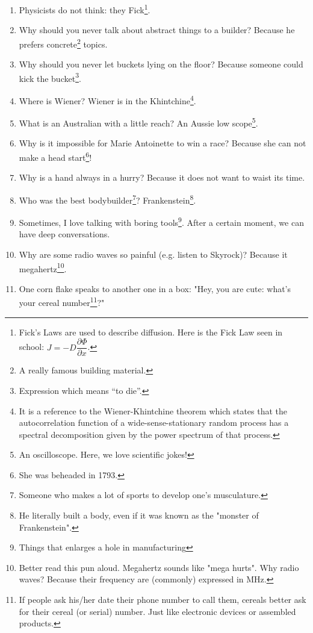 \documentclass[10pt,a5paper,fullpage]{book}
\begin{document}
\begin{enumerate}
		\item Physicists do not think: they Fick\footnote{Fick’s Laws are used to describe diffusion. Here is the Fick Law seen in school: $J = -D\dfrac{\partial \Phi}{\partial x}$.}.
		\item Why should you never talk about abstract things to a builder? Because he prefers concrete\footnote{A really famous building material.} topics.
		\item Why should you never let buckets lying on the floor? Because someone could kick the bucket\footnote{Expression which means “to die”.}.
		\item Where is Wiener? Wiener is in the Khintchine\footnote{It is a reference to the Wiener-Khintchine theorem which states that the autocorrelation function of a wide-sense-stationary random process has a spectral decomposition given by the power spectrum of that process.}.
		\item What is an Australian with a little reach? An Aussie low scope\footnote{An oscilloscope. Here, we love scientific jokes!}.
		\item Why is it impossible for Marie Antoinette to win a race? Because she can not make a head start\footnote{She was beheaded in 1793.}!
		\item Why is a hand always in a hurry? Because it does not want to waist its time. 
		\item Who was the best bodybuilder\footnote{Someone who makes a lot of sports to develop one's musculature.}? Frankenstein\footnote{He literally built a body, even if it was known as the "monster of Frankenstein".}. 
		\item Sometimes, I love talking with boring tools\footnote{Things that enlarges a hole in manufacturing}. After a certain moment, we can have deep conversations. 
		\item Why are some radio waves so painful (e.g. listen to Skyrock)? Because it megahertz\footnote{Better read this pun aloud. Megahertz sounds like "mega hurts". Why radio waves? Because their frequency are (commonly) expressed in MHz.}. 
		\item One corn flake speaks to another one in a box: "Hey, you are cute: what's your cereal number\footnote{If people ask his/her date their phone number to call them, cereals better ask for their cereal (or serial) number. Just like electronic devices or assembled products.}?"
	\end{enumerate}
	
\end{document}
